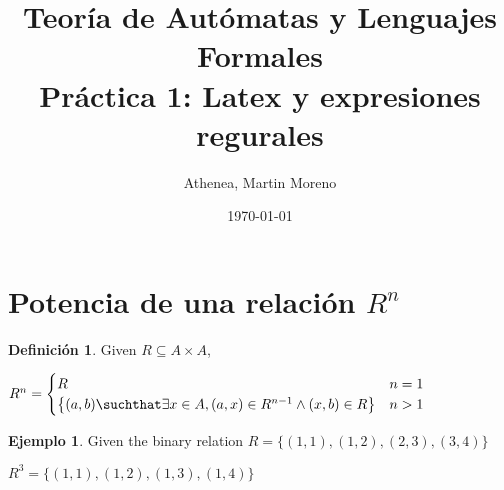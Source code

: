 \documentclass{article}
\title{Teoría de Autómatas y Lenguajes Formales\\[.4\baselineskip]Práctica 1: Latex y expresiones regurales}
\author{Athenea, Martin Moreno}
\date{\today}
\theoremstyle{plain}
\theoremstyle{definition}
\newtheorem{definition}{Definición}[section]
\newtheorem{example}{Ejemplo}[section]
\begin{document}
\maketitle

\section{Potencia de una relación $R^n$}

\begin {definition}
Given $ R \subseteq A \times A $,

\begin{center}
$ R^n = \begin{cases}
R & n=1 \\
\left\{(a,b) \suchthat \exists x \in A, (a,x)\in R^{n-1}\wedge (x,b)\in R\right\} & n > 1

\end{cases}$
\end{center}

\end {definition}

\begin{example}
Given the binary relation $R = \{(1, 1), (1, 2), (2, 3),(3,4)\}$


\qquad $R^3 = \{(1, 1), (1, 2), (1, 3),(1,4)\}$


\end{example}
\end{document}
